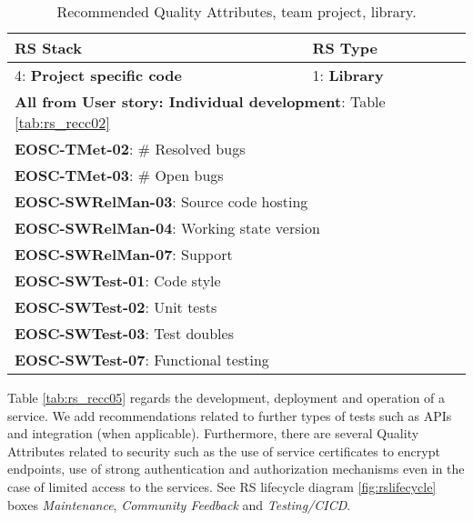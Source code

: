 \begin{center}
\begin{table}[h]
  \small
  \begin{tabular}{|p{0.65\linewidth}|p{0.35\linewidth}|} \hline

    \textbf{RS Stack} & \textbf{RS Type} \\ \hline \hline
    4: \textbf{Project specific code} &
    1: \textbf{Library} \\ \hline \hline
    \multicolumn{2}{|l|}{\textbf{All from User story: Individual development}: Table \ref{tab:rs_recc02}} \\ \hline
    \multicolumn{2}{|l|}{\textbf{EOSC-TMet-02}: \# Resolved bugs} \\ \hline
    \multicolumn{2}{|l|}{\textbf{EOSC-TMet-03}: \# Open bugs} \\ \hline
    \multicolumn{2}{|l|}{\textbf{EOSC-SWRelMan-03}: Source code hosting} \\ \hline
    \multicolumn{2}{|l|}{\textbf{EOSC-SWRelMan-04}: Working state version} \\ \hline
    \multicolumn{2}{|l|}{\textbf{EOSC-SWRelMan-07}: Support} \\ \hline
    \multicolumn{2}{|l|}{\textbf{EOSC-SWTest-01}: Code style} \\ \hline
    \multicolumn{2}{|l|}{\textbf{EOSC-SWTest-02}: Unit tests} \\ \hline
    \multicolumn{2}{|l|}{\textbf{EOSC-SWTest-03}: Test doubles} \\ \hline
    \multicolumn{2}{|l|}{\textbf{EOSC-SWTest-07}: Functional testing} \\ \hline

  \end{tabular}
  \caption{Recommended Quality Attributes, team project, library.}
  \label{tab:rs_recc04}
\end{table}
\end{center}

Table \ref{tab:rs_recc05} regards the development, deployment and operation of a service. We add recommendations related to further types of tests such as APIs and integration (when applicable). Furthermore, there are several Quality Attributes related to security such as the use of service certificates to encrypt endpoints, use of strong authentication and authorization mechanisms even in the case of limited access to the services. See RS lifecycle diagram \ref{fig:rslifecycle} boxes \textit{Maintenance}, \textit{Community Feedback} and \textit{Testing/CICD}.

